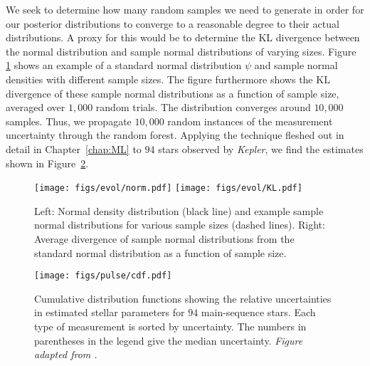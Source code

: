 We seek to determine how many random samples we need to generate in order for our posterior distributions to converge to a reasonable degree to their actual distributions. 
A proxy for this would be to determine the KL divergence between the normal distribution and sample normal distributions of varying sizes. 
Figure \ref{fig:kl} shows an example of a standard normal distribution $\psi$ and sample normal densities with different sample sizes. 
The figure furthermore shows the KL divergence of these sample normal distributions as a function of sample size, averaged over $1,000$ random trials. 
The distribution converges around $10,000$ samples. 
Thus, we propagate $10,000$ random instances of the measurement uncertainty through the random forest. 
Applying the technique fleshed out in detail in Chapter~\ref{chap:ML} to $94$ stars observed by \emph{Kepler}, we find the estimates shown in Figure~\ref{fig:posterior-cdf}. 

\begin{figure}
    \centering
    \texttt{[image: figs/evol/norm.pdf]}%
    \texttt{[image: figs/evol/KL.pdf]}
    \caption[Relative entropy of sample normal distributions]{Left: Normal density distribution (black line) and example sample normal distributions for various sample sizes (dashed lines). 
    Right: Average divergence of sample normal distributions from the standard normal distribution as a function of sample size. 
    \label{fig:kl}}
\end{figure}

\begin{figure}
    \texttt{[image: figs/pulse/cdf.pdf]}
    \caption[Relative uncertainties in estimated stellar parameters]{Cumulative distribution functions showing the relative uncertainties in estimated stellar parameters for $94$ main-sequence stars. 
    Each type of measurement is sorted by uncertainty. 
    The numbers in parentheses in the legend give the median uncertainty. 
    \emph{Figure adapted from \citealt{2017EPJWC.16005003B}.}
    \label{fig:posterior-cdf}}
\end{figure}


